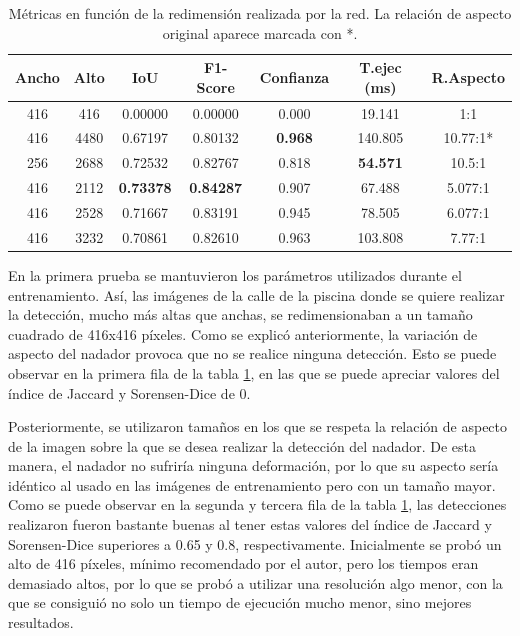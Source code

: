 \begin{table}
    \centering
    \small
    \begin{tabular}{| c | c | c | c | c | c | c| } \hline
        Ancho & Alto & IoU & F1-Score & Confianza & T.ejec (ms) & R.Aspecto \\ \hline
        416 & 416 & 0.00000 & 0.00000 & 0.000 & 19.141 & 1:1 \\
        416 & 4480 & 0.67197 & 0.80132 & \textbf{0.968} & 140.805 & 10.77:1* \\ 
        256 & 2688 & 0.72532 & 0.82767 & 0.818 & \textbf{54.571} & 10.5:1 \\ 
        416 & 2112 & \textbf{0.73378} & \textbf{0.84287} & 0.907 & 67.488 & 5.077:1  \\
        416 & 2528 & 0.71667 & 0.83191 & 0.945 & 78.505 & 6.077:1 \\ 
        416 & 3232 & 0.70861 & 0.82610 &  0.963 & 103.808 & 7.77:1 \\ \hline
    \end{tabular}
    \caption{Métricas en función de la redimensión realizada por la red. La relación de aspecto original aparece marcada con *.}
    \label{tab:yolosizematters}
\end{table}

En la primera prueba se mantuvieron los parámetros utilizados durante el entrenamiento. Así, las imágenes de la calle de la piscina donde se quiere realizar la detección, mucho más altas que anchas, se redimensionaban a un tamaño cuadrado de 416x416 píxeles. Como se explicó anteriormente, la variación de aspecto del nadador provoca que no se realice ninguna detección. Esto se puede observar en la primera fila de la tabla \ref{tab:yolosizematters}, en las que se puede apreciar valores del índice de Jaccard y Sorensen-Dice de 0.

Posteriormente, se utilizaron tamaños en los que se respeta la relación de aspecto de la imagen sobre la que se desea realizar la detección del nadador. De esta manera, el nadador no sufriría ninguna deformación, por lo que su aspecto sería idéntico al usado en las imágenes de entrenamiento pero con un tamaño mayor. Como se puede observar en la segunda y tercera fila de la tabla \ref{tab:yolosizematters}, las detecciones realizaron fueron bastante buenas al tener estas valores del índice de Jaccard y Sorensen-Dice superiores a 0.65 y 0.8, respectivamente. Inicialmente se probó un alto de 416 píxeles, mínimo recomendado por el autor, pero los tiempos eran demasiado altos, por lo que se probó a utilizar una resolución algo menor, con la que se consiguió no solo un tiempo de ejecución mucho menor, sino mejores resultados.

